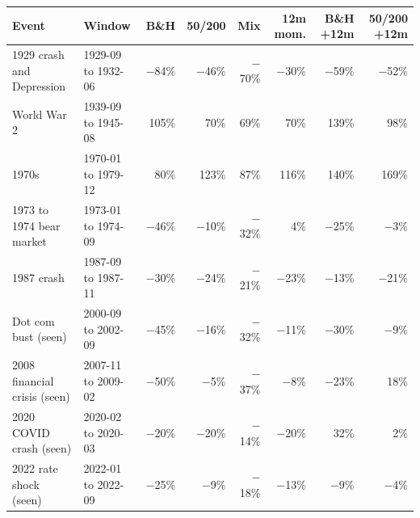 \begin{tabular}{llrrrrrr}
\toprule
Event & Window & B\&H & 50/200 & Mix & 12m mom. & B\&H +12m & 50/200 +12m \\
\midrule
1929 crash and Depression & 1929-09 to 1932-06 & $-$84\% & $-$46\% & $-$70\% & $-$30\% & $-$59\% & $-$52\% \\
World War 2 & 1939-09 to 1945-08 & 105\% & 70\% & 69\% & 70\% & 139\% & 98\% \\
1970s & 1970-01 to 1979-12 & 80\% & 123\% & 87\% & 116\% & 140\% & 169\% \\
1973 to 1974 bear market & 1973-01 to 1974-09 & $-$46\% & $-$10\% & $-$32\% & 4\% & $-$25\% & $-$3\% \\
1987 crash & 1987-09 to 1987-11 & $-$30\% & $-$24\% & $-$21\% & $-$23\% & $-$13\% & $-$21\% \\
Dot com bust (seen) & 2000-09 to 2002-09 & $-$45\% & $-$16\% & $-$32\% & $-$11\% & $-$30\% & $-$9\% \\
2008 financial crisis (seen) & 2007-11 to 2009-02 & $-$50\% & $-$5\% & $-$37\% & $-$8\% & $-$23\% & 18\% \\
2020 COVID crash (seen) & 2020-02 to 2020-03 & $-$20\% & $-$20\% & $-$14\% & $-$20\% & 32\% & 2\% \\
2022 rate shock (seen) & 2022-01 to 2022-09 & $-$25\% & $-$9\% & $-$18\% & $-$13\% & $-$9\% & $-$4\% \\
\bottomrule
\end{tabular}
